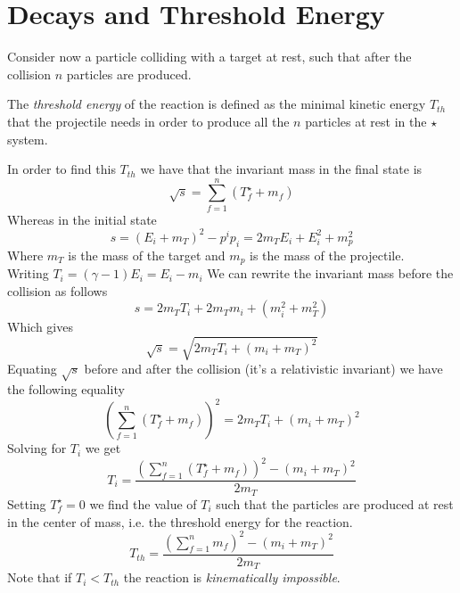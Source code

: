 \documentclass[../admech.tex]{subfiles}
\begin{document}
\section{Decays and Threshold Energy}
Consider now a particle colliding with a target at rest, such that after the collision $n$ particles are produced.
\begin{dfn}
	The \emph{threshold energy} of the reaction is defined as the minimal kinetic energy $T_{th}$ that the projectile needs in order to produce all the $n$ particles at rest in the $\star$ system.
\end{dfn}
In order to find this $T_{th}$ we have that the invariant mass in the final state is
\begin{equation}
	\sqrt{s}=\sum_{f=1}^n\left( T_f^\star+m_f \right)
	\label{eq:invmassnbodyprod}
\end{equation}
Whereas in the initial state
\begin{equation}
	s=\left( E_i+m_T \right)^2-p^ip_i=2m_TE_i+E_i^2+m_p^2
	\label{eq:invmassnbodyprodpre}
\end{equation}
Where $m_T$ is the mass of the target and $m_p$ is the mass of the projectile.\\
Writing $T_i=(\gamma-1)E_i=E_i-m_i$ We can rewrite the invariant mass before the collision as follows
\begin{equation*}
	s=2m_TT_i+2m_Tm_i+(m_i^2+m_T^2)
\end{equation*}
Which gives
\begin{equation}
	\sqrt{s}=\sqrt{2m_TT_i+(m_i+m_T)^2}
	\label{eq:sqrtspreT}
\end{equation}
Equating $\sqrt{s}$ before and after the collision (it's a relativistic invariant) we have the following equality
\begin{equation}
	\left( \sum_{f=1}^n\left( T_f^\star+m_f \right) \right)^2=2m_TT_i+(m_i+m_T)^2
	\label{eq:Tisqrtspreaf}
\end{equation}
Solving for $T_i$ we get
\begin{equation}
	T_i=\frac{\left( \sum_{f=1}^n(T_f^\star+m_f) \right)^2-(m_i+m_T)^2}{2m_T}
	\label{eq:kinnecessarysqrts}
\end{equation}
Setting $T_f^\star=0$ we find the value of $T_i$ such that the particles are produced at rest in the center of mass, i.e. the threshold energy for the reaction.
\begin{equation}
	T_{th}=\frac{\left( \sum_{f=1}^nm_f \right)^2-(m_i+m_T)^2}{2m_T}
	\label{eq:thresholdenergygeneral}
\end{equation}
Note that if $T_i<T_{th}$ the reaction is \textit{kinematically impossible}.
\end{document}
